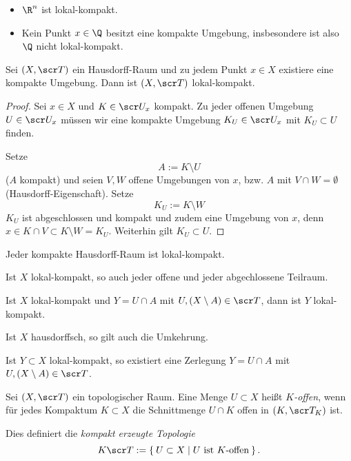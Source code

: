 \begin{ex}
	\begin{itemize}
		\item
			$\R^n$ ist lokal-kompakt.
		\item
			Kein Punkt $x\in \Q$ besitzt eine kompakte Umgebung, insbesondere ist also $\Q$ nicht lokal-kompakt.
	\end{itemize}
\end{ex}

\begin{st}
	Sei $(X, \scr T)$ ein Hausdorff-Raum und zu jedem Punkt $x \in X$ existiere eine kompakte Umgebung.
	Dann ist $(X, \scr T)$ lokal-kompakt.
	\begin{proof}
		Sei $x \in X$ und $K \in \scr U_x$ kompakt.
		Zu jeder offenen Umgebung $U \in \scr U_x$ müssen wir eine kompakte Umgebung $K_U \in \scr U_x$ mit $K_U \subset U$ finden.

		Setze
		\[
			A := K \setminus U
		\]
		($A$ kompakt) und seien $V, W$ offene Umgebungen von $x$, bzw. $A$ mit $V \cap W = \emptyset$ (Hausdorff-Eigenschaft).
		Setze
		\[
			K_U := K \setminus W
		\]
		$K_U$ ist abgeschlossen und kompakt und zudem eine Umgebung von $x$, denn $x \in K \cap V \subset K \setminus W = K_U$.
		Weiterhin gilt $K_U \subset U$.
	\end{proof}
\end{st}

\begin{kor}
	Jeder kompakte Hausdorff-Raum ist lokal-kompakt.
\end{kor}

\begin{lem}
	Ist $X$ lokal-kompakt, so auch jeder offene und jeder abgechlossene Teilraum.
\end{lem}

\begin{st}
	Ist $X$ lokal-kompakt und $Y = U \cap A$ mit $U, (X \setminus A) \in \scr T$, dann ist $Y$ lokal-kompakt.

	Ist $X$ hausdorffsch, so gilt auch die Umkehrung.

	Ist $Y \subset X$ lokal-kompakt, so existiert eine Zerlegung $Y = U \cap A$ mit $U, (X \setminus A) \in \scr T$.
\end{st}

\begin{df}
	Sei $(X, \scr T)$ ein topologischer Raum.
	Eine Menge $U \subset X$ heißt \emph{$K$-offen}, wenn für jedes Kompaktum $K \subset X$ die Schnittmenge $U \cap K$ offen in $(K, \scr T_K)$ ist.

	Dies definiert die \emph{kompakt erzeugte Topologie}
	\[
		K \scr T :=
		\Set{ U \subset X | U \text{ ist $K$-offen} }.
	\]
\end{df}

